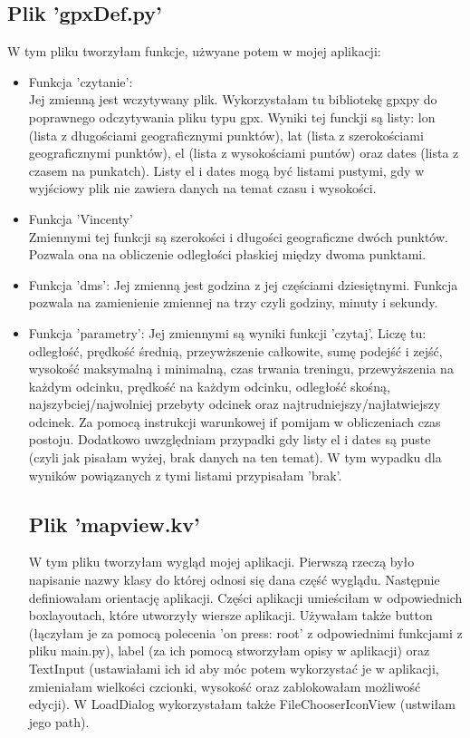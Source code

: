 \documentclass[10pt,a4paper]{article}
\begin{document}
\subsection{Plik 'gpxDef.py'}
W tym pliku tworzyłam funkcje, użwyane potem w mojej aplikacji:
\begin{itemize}
	\item Funkcja 'czytanie':
	\\ Jej zmienną jest wczytywany plik. Wykorzystałam tu bibliotekę gpxpy do poprawnego odczytywania pliku typu gpx. Wyniki tej funckji są listy: lon (lista z długościami geograficznymi punktów), lat (lista z szerokościami geograficznymi punktów), el (lista z wysokościami puntów) oraz dates (lista z czasem na punkatch). Listy el i dates mogą być listami pustymi, gdy w wyjściowy plik nie zawiera danych na temat czasu i wysokości. 
	\item Funkcja 'Vincenty' 
	\\Zmiennymi tej funkcji są szerokości i długości geograficzne dwóch punktów. Pozwala ona na obliczenie odległości płaskiej między dwoma punktami.
	\item Funkcja 'dms':
	Jej zmienną jest godzina z jej częściami dziesiętnymi. Funkcja pozwala na zamienienie zmiennej na trzy czyli godziny, minuty i sekundy.
	\item Funkcja 'parametry':
	Jej zmiennymi są wyniki funkcji 'czytaj'. Liczę tu: odległość, prędkość średnią, przeywższenie całkowite, sumę podejść i zejść, wysokość maksymalną i minimalną, czas trwania treningu, przewyższenia na każdym odcinku, prędkość na każdym odcinku, odległość skośną, najszybciej/najwolniej przebyty odcinek oraz najtrudniejszy/najłatwiejszy odcinek. Za pomocą instrukcji warunkowej if pomijam w obliczeniach czas postoju. Dodatkowo uwzględniam przypadki gdy listy el i dates są puste (czyli jak pisałam wyżej, brak danych na ten temat). W tym wypadku dla wyników powiązanych z tymi listami przypisałam 'brak'.

\subsection{Plik 'mapview.kv'} 
W tym pliku tworzyłam wygląd mojej aplikacji. Pierwszą rzeczą było napisanie nazwy klasy do której odnosi się dana część wyglądu. Następnie definiowałam orientację aplikacji. Części aplikacji umieściłam w odpowiednich boxlayoutach, które utworzyły wiersze aplikacji. Używałam także button (łączyłam je za pomocą polecenia 'on press: root' z odpowiednimi funkcjami z pliku main.py), label (za ich pomocą stworzyłam opisy w aplikacji) oraz TextInput (ustawiałami ich id aby móc potem wykorzystać je w aplikacji, zmieniałam wielkości czcionki, wysokość oraz zablokowałam możliwość edycji). W LoadDialog wykorzystałam także FileChooserIconView (ustwiłam jego path).


\end{itemize}
\end{document}
